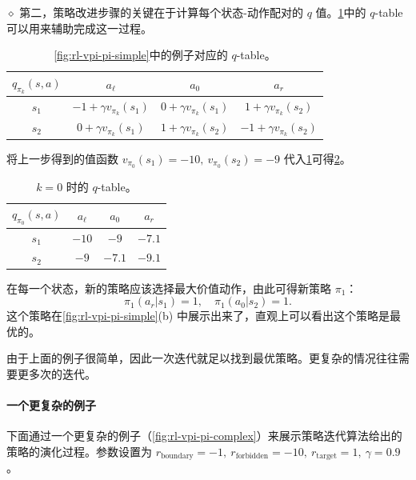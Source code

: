 $\diamond$ 第二，策略改进步骤的关键在于计算每个状态-动作配对的 $q$ 值。\cref{tab:rl-vpi-pi-qtable}中的 $q$-table 可以用来辅助完成这一过程。

\begin{table}[H]
\centering
\caption{\cref{fig:rl-vpi-pi-simple}中的例子对应的 $q$-table。}
\label{tab:rl-vpi-pi-qtable}
\begin{tabular}{cccc}
\toprule
$q_{\pi_k}(s,a)$ & $a_{\ell}$ & $a_{0}$ & $a_{r}$ \\
\midrule
$s_1$ & $-1 + \gamma v_{\pi_k}(s_1)$ & $0 + \gamma v_{\pi_k}(s_1)$ & $1 + \gamma v_{\pi_k}(s_2)$ \\
$s_2$ & $0 + \gamma v_{\pi_k}(s_1)$  & $1 + \gamma v_{\pi_k}(s_2)$ & $-1 + \gamma v_{\pi_k}(s_2)$ \\
\bottomrule
\end{tabular}
\end{table}

将上一步得到的值函数 $v_{\pi_0}(s_1) = -10,\ v_{\pi_0}(s_2) = -9$ 代入\cref{tab:rl-vpi-pi-qtable}可得\cref{tab:rl-vpi-pi-qtable-k0}。

\begin{table}[H]
\centering
\caption{$k = 0$ 时的 $q$-table。}
\label{tab:rl-vpi-pi-qtable-k0}
\begin{tabular}{cccc}
\toprule
$q_{\pi_0}(s,a)$ & $a_{\ell}$ & $a_{0}$ & $a_{r}$ \\
\midrule
$s_1$ & $-10$ & $-9$   & $-7.1$ \\
$s_2$ & $-9$  & $-7.1$ & $-9.1$ \\
\bottomrule
\end{tabular}
\end{table}

在每一个状态，新的策略应该选择最大价值动作，由此可得新策略 $\pi_1$：
$$
\pi_{1}(a_{r}|s_{1}) = 1, \quad \pi_{1}(a_{0}|s_{2}) = 1.
$$
这个策略在\cref{fig:rl-vpi-pi-simple}(b) 中展示出来了，直观上可以看出这个策略是最优的。

由于上面的例子很简单，因此一次迭代就足以找到最优策略。更复杂的情况往往需要更多次的迭代。

\paragraph{一个更复杂的例子}

下面通过一个更复杂的例子（\cref{fig:rl-vpi-pi-complex}）来展示策略迭代算法给出的策略的演化过程。参数设置为 $r_{\mathrm{boundary}} = -1,\ r_{\mathrm{forbidden}} = -10,\ r_{\mathrm{target}} = 1,\ \gamma = 0.9$。


